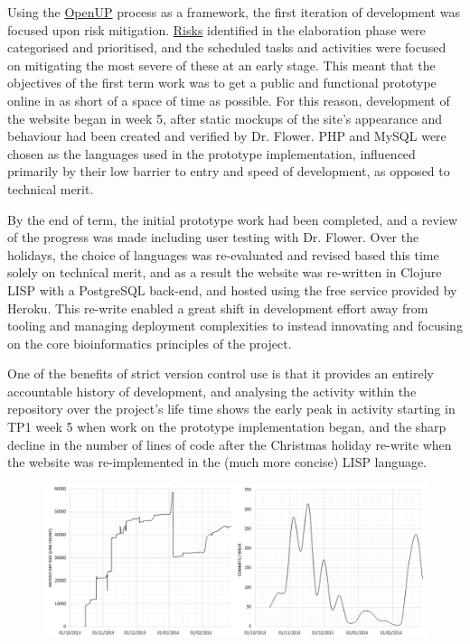 \documentclass[12pt,a4paper]{article}
\begin{document}
Using the \href{http://epf.eclipse.org/wikis/openup/}{OpenUP} process
as a framework, the first iteration of development was focused upon
risk
mitigation. \href{https://github.com/ChrisCummins/pip-db/blob/master/Documentation/ProjectPlan.md#risk-assessment}{Risks}
identified in the elaboration phase were categorised and prioritised,
and the scheduled tasks and activities were focused on mitigating the
most severe of these at an early stage. This meant that the objectives
of the first term work was to get a public and functional prototype
online in as short of a space of time as possible. For this reason,
development of the website began in week 5, after static mockups of
the site's appearance and behaviour had been created and verified by
Dr. Flower. PHP and MySQL were chosen as the languages used in the
prototype implementation, influenced primarily by their low barrier to
entry and speed of development, as opposed to technical merit.

By the end of term, the initial prototype work had been completed, and
a review of the progress was made including user testing with
Dr. Flower. Over the holidays, the choice of languages was
re-evaluated and revised based this time solely on technical merit,
and as a result the website was re-written in Clojure LISP with a
PostgreSQL back-end, and hosted using the free service provided by
Heroku. This re-write enabled a great shift in development effort away
from tooling and managing deployment complexities to instead
innovating and focusing on the core bioinformatics principles of the
project.

One of the benefits of strict version control use is that it provides
an entirely accountable history of development, and analysing the
activity within the repository over the project's life time shows the
early peak in activity starting in TP1 week 5 when work on the
prototype implementation began, and the sharp decline in the number of
lines of code after the Christmas holiday re-write when the website
was re-implemented in the (much more concise) LISP language.

\begin{figure}[H]
  \centering
  \includegraphics[width=7.2in]{assets/activity.png}
\end{figure}
\end{document}

